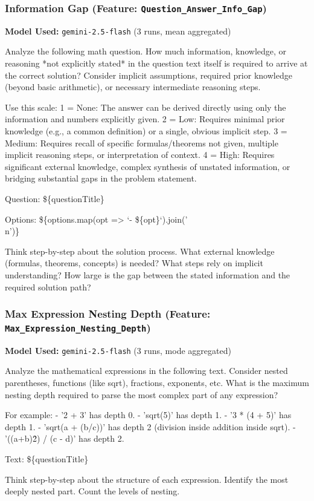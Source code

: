\documentclass[
    a4paper, %
    10pt, %
    twoside, %
]{LTJournalArticle}
\begin{document}
\subsubsection{Information Gap (Feature: \texttt{Question\_Answer\_Info\_Gap})}
\label{app:prompt_info_gap}
\textbf{Model Used:} \texttt{gemini-2.5-flash} (3 runs, mean aggregated)
\begin{promptbox}
Analyze the following math question. How much information, knowledge, or reasoning *not explicitly stated* in the question text itself is required to arrive at the correct solution? Consider implicit assumptions, required prior knowledge (beyond basic arithmetic), or necessary intermediate reasoning steps.

Use this scale:
1 = None: The answer can be derived directly using only the information and numbers explicitly given.
2 = Low: Requires minimal prior knowledge (e.g., a common definition) or a single, obvious implicit step.
3 = Medium: Requires recall of specific formulas/theorems not given, multiple implicit reasoning steps, or interpretation of context.
4 = High: Requires significant external knowledge, complex synthesis of unstated information, or bridging substantial gaps in the problem statement.

Question:
\$\{questionTitle\}

Options:
\$\{options.map(opt => `- \$\{opt\}`).join('\\n')\}

Think step-by-step about the solution process. What external knowledge (formulas, theorems, concepts) is needed? What steps rely on implicit understanding? How large is the gap between the stated information and the required solution path?
\end{promptbox}

\subsubsection{Max Expression Nesting Depth (Feature: \texttt{Max\_Expression\_Nesting\_Depth})}
\label{app:prompt_nesting_depth}
\textbf{Model Used:} \texttt{gemini-2.5-flash} (3 runs, mode aggregated)
\begin{promptbox}
Analyze the mathematical expressions in the following text. Consider nested parentheses, functions (like sqrt), fractions, exponents, etc. What is the maximum nesting depth required to parse the most complex part of any expression?

For example:
- '2 + 3' has depth 0.
- 'sqrt(5)' has depth 1.
- '3 * (4 + 5)' has depth 1.
- 'sqrt(a + (b/c))' has depth 2 (division inside addition inside sqrt).
- '((a+b)\^2) / (c - d)' has depth 2.

Text:
\$\{questionTitle\}

Think step-by-step about the structure of each expression. Identify the most deeply nested part. Count the levels of nesting.
\end{promptbox}
\end{document}
